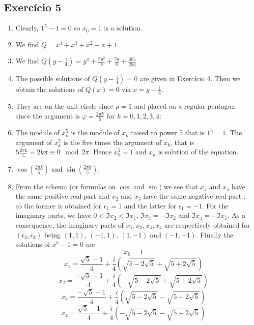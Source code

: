 \subsection*{Exercício 5}

\begin{enumerate}
\item Clearly, $1^5-1=0$ so $x_0=1$ is a solution.
\item We find $Q=x^4+x^3+x^2+x+1$
\item We find $Q(y-\frac{1}{4}) =
  y^4+\frac{5y^2}{8}+\frac{5y}{8}+\frac{205}{256}$
\item The possible solutions of $Q(y-\frac{1}{4}) = 0$ are given in Exercício 4.
  Then we obtain the solutions of $Q(x)=0$ via $x=y-\frac{1}{4}$.
\item They are on the unit circle since $\rho=1$ and placed on a regular
  pentagon since the argument is $\varphi = \frac{2 \pi k}{5}$ for
  $k=0,1,2,3,4$:

  \begin{center}
\end{center}
\item The module of $x_k^5$ is the module of $x_k$ raised to power 5 that
  is $1^5 = 1$. The argument of $x_k^5$ is the five times the argument of $x_k$,
  that is $5 \frac{2\pi k}{5} = 2 k \pi \equiv 0 \mod 2\pi$. Hence
  $x_k^5=1$ and $x_k$ is solution of the equation.

\item $\cos\left(\frac{2\pi k}{5}\right)$ and
  $\sin\left(\frac{2\pi k}{5}\right)$.

\item From the schema (or formulas on $\cos$ and $\sin$) we see that
  $x_1$ and $x_4$ have the same positive real part and
  $x_2$ and $x_3$ have the same negative real part ; so the former is obtained
  for $\epsilon_1=1$ and the latter for $\epsilon_1=-1$.
  For the imaginary parts, we have $0 < \Im x_2 < \Im x_1$,
  $\Im x_3 = -\Im x_2$ and
  $\Im x_4 = -\Im x_1$. As a consequence, the imaginary parts of
  $x_1,x_2,x_3,x_4$ are respectively obtained for $(\epsilon_2,\epsilon_3)$
  being $(1,1)$, $(-1,1)$, $(1,-1)$ and $(-1,-1)$. Finally the solutions
  of $x^5-1=0$ are
  $$x_0=1$$
  $$x_1=\frac{\sqrt{5} - 1}{4}+
  \frac{i}{4} \left(\sqrt{5-2\sqrt{5}}+\sqrt{5+2\sqrt{5}} \right)$$
  $$x_2=\frac{-\sqrt{5} - 1}{4}+
  \frac{i}{4} \left(-\sqrt{5-2\sqrt{5}}+\sqrt{5+2\sqrt{5}} \right)$$
  $$x_3=\frac{-\sqrt{5} - 1}{4}+
  \frac{i}{4} \left(\sqrt{5-2\sqrt{5}}-\sqrt{5+2\sqrt{5}} \right)$$
  $$x_4=\frac{\sqrt{5} - 1}{4}+
  \frac{i}{4} \left(-\sqrt{5-2\sqrt{5}}-\sqrt{5+2\sqrt{5}} \right)$$


\end{enumerate}
